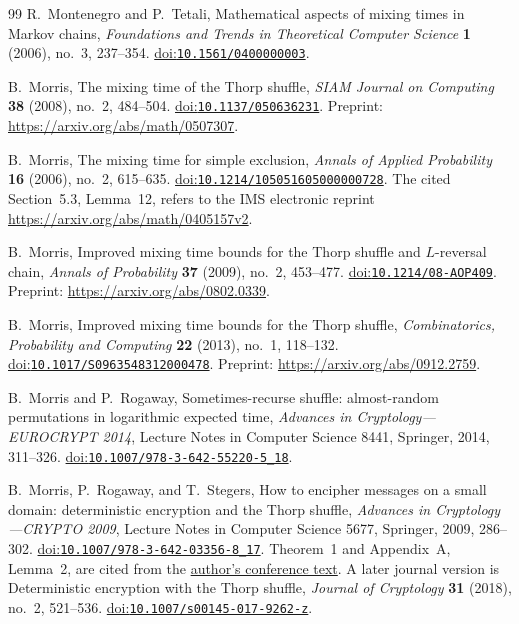 \begin{thebibliography}{99}
R.~Montenegro and P.~Tetali,
Mathematical aspects of mixing times in Markov chains,
\emph{Foundations and Trends in Theoretical Computer Science}
\textbf{1} (2006), no.~3, 237--354.
\href{https://doi.org/10.1561/0400000003}{doi:\nolinkurl{10.1561/0400000003}}.

B.~Morris,
The mixing time of the Thorp shuffle,
\emph{SIAM Journal on Computing} \textbf{38} (2008), no.~2, 484--504.
\href{https://doi.org/10.1137/050636231}{doi:\nolinkurl{10.1137/050636231}}.
Preprint: \url{https://arxiv.org/abs/math/0507307}.

B.~Morris,
The mixing time for simple exclusion,
\emph{Annals of Applied Probability} \textbf{16} (2006), no.~2, 615--635.
\href{https://doi.org/10.1214/105051605000000728}{doi:\nolinkurl{10.1214/105051605000000728}}.
The cited Section~5.3, Lemma~12, refers to the IMS electronic reprint
\url{https://arxiv.org/abs/math/0405157v2}.

B.~Morris,
Improved mixing time bounds for the Thorp shuffle and $L$-reversal chain,
\emph{Annals of Probability} \textbf{37} (2009), no.~2, 453--477.
\href{https://doi.org/10.1214/08-AOP409}{doi:\nolinkurl{10.1214/08-AOP409}}.
Preprint: \url{https://arxiv.org/abs/0802.0339}.

B.~Morris,
Improved mixing time bounds for the Thorp shuffle,
\emph{Combinatorics, Probability and Computing} \textbf{22} (2013),
no.~1, 118--132.
\href{https://doi.org/10.1017/S0963548312000478}{doi:\nolinkurl{10.1017/S0963548312000478}}.
Preprint: \url{https://arxiv.org/abs/0912.2759}.

B.~Morris and P.~Rogaway,
Sometimes-recurse shuffle: almost-random permutations in logarithmic expected time,
\emph{Advances in Cryptology---EUROCRYPT 2014},
Lecture Notes in Computer Science 8441, Springer, 2014, 311--326.
\href{https://doi.org/10.1007/978-3-642-55220-5_18}{doi:\nolinkurl{10.1007/978-3-642-55220-5_18}}.

B.~Morris, P.~Rogaway, and T.~Stegers,
How to encipher messages on a small domain:
deterministic encryption and the Thorp shuffle,
\emph{Advances in Cryptology---CRYPTO 2009},
Lecture Notes in Computer Science 5677, Springer, 2009, 286--302.
\href{https://doi.org/10.1007/978-3-642-03356-8_17}{doi:\nolinkurl{10.1007/978-3-642-03356-8_17}}.
Theorem~1 and Appendix~A, Lemma~2, are cited from the
\href{https://www.cs.ucdavis.edu/~rogaway/papers/thorp.pdf}{author's conference text}.
A later journal version is Deterministic encryption with the Thorp shuffle,
\emph{Journal of Cryptology} \textbf{31} (2018), no.~2, 521--536.
\href{https://doi.org/10.1007/s00145-017-9262-z}{doi:\nolinkurl{10.1007/s00145-017-9262-z}}.


\end{thebibliography}
